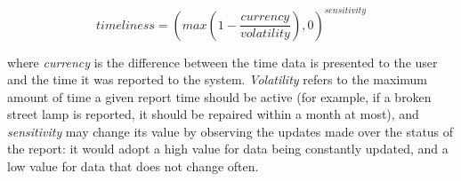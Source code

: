 \begin{equation}
    timeliness = (max(1-\frac{currency}{volatility}), 0)^{sensitivity}
\end{equation}

where \emph{currency} is the difference between the time data is presented to the user and the time it was reported to the system. \emph{Volatility} refers to the maximum amount of time a given report time should be active (for example, if a broken street lamp is reported, it should be repaired within a month at most), and \emph{sensitivity} may change its value by observing the updates made over the status of the report: it would adopt a high value for data being constantly updated, and a low value for data that does not change often.
